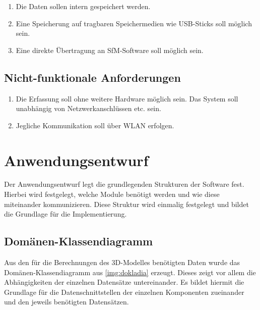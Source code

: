 \documentclass[./00PhotoBox.tex]{subfiles}
\begin{document}
\begin{enumerate}[label=S\arabic*]
    \item \label{e:intspeicher} Die Daten sollen intern gespeichert werden.
    \item \label{e:usbspeicher} Eine Speicherung auf tragbaren Speichermedien wie USB-Sticks soll möglich sein.
    \item \label{e:sfmsoftware} Eine direkte Übertragung an \Gls{SfM}-Software soll möglich sein.
\end{enumerate}

\subsection{Nicht-funktionale Anforderungen}
\begin{enumerate}[label=N\arabic*]
    \item \label{e:standalone} Die Erfassung soll ohne weitere Hardware möglich sein. Das System soll unabhängig von Netzwerkanschlüssen etc. sein.
    \item \label{e:wlan} Jegliche Kommunikation soll über WLAN erfolgen.
\end{enumerate}


\section{Anwendungsentwurf}
Der Anwendungsentwurf legt die grundlegenden Strukturen der Software fest. Hierbei wird festgelegt, welche Module benötigt werden und wie diese miteinander kommunizieren. Diese Struktur wird einmalig festgelegt und bildet die Grundlage für die Implementierung.

\subsection{Domänen-Klassendiagramm}
Aus den für die Berechnungen des 3D-Modelles benötigten Daten wurde das Domänen-Klassendiagramm aus \autoref{img:dokladia} erzeugt. Dieses zeigt vor allem die Abhängigkeiten der einzelnen Datensätze untereinander. Es bildet hiermit die Grundlage für die Datenschnittstellen der einzelnen Komponenten zueinander und den jeweils benötigten Datensätzen.
\end{document}
